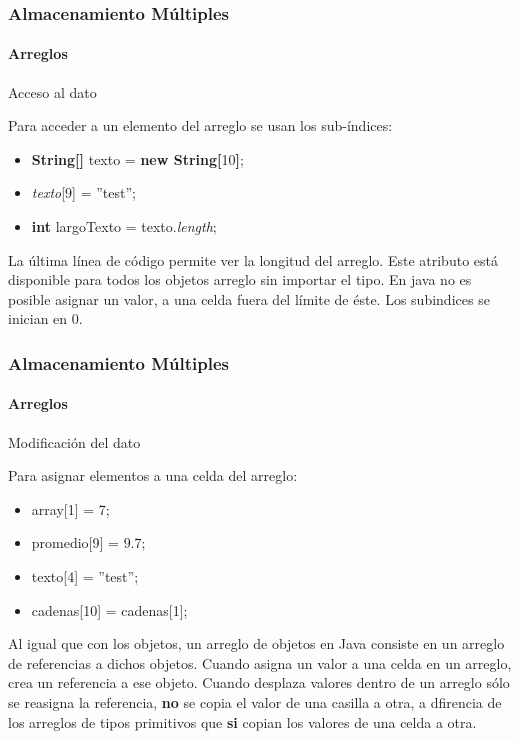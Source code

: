 \documentclass{beamer}
\begin{document}
        \begin{frame}
			\frametitle{Almacenamiento M\'ultiples}
			\framesubtitle{Arreglos}

			\begin{block}{Acceso al dato}
			    {\scriptsize
				    Para acceder a un elemento del arreglo se usan los sub-\'indices:
				    \begin{itemize}
                        \item[] \textbf{String[]} texto = \textbf{new String[}10\textbf{]};
                        \item[] \emph{texto}[9] = ''test'';
                        \item[] \textbf{int} largoTexto = texto.\emph{length};
                     \end{itemize}
			    }
			\end{block}
			\begin{block}{}
			    {\scriptsize
                     La \'ultima l\'inea de c\'odigo permite ver la longitud del arreglo. Este atributo est\'a disponible para todos los objetos arreglo sin importar el tipo. En java no es posible asignar un valor, a una celda fuera del l\'imite de \'este. Los subindices se inician en 0.
			    }
			\end{block}
		\end{frame}

        \begin{frame}
			\frametitle{Almacenamiento M\'ultiples}
			\framesubtitle{Arreglos}

			\begin{block}{Modificaci\'on del dato}
			    {\scriptsize
				    Para asignar elementos a una celda del arreglo:
				    \begin{itemize}
                        \item[] array[1] = 7;
                        \item[] promedio[9] = $9.7$;
                        \item[] texto[4] = ''test'';
                        \item[] cadenas[10] = cadenas[1];
                     \end{itemize}
			    }
			\end{block}
			\begin{block}{}
			    {\scriptsize
                     Al igual que con los objetos, un arreglo de objetos en Java consiste en un arreglo de referencias a dichos objetos. Cuando asigna un valor a una celda en un arreglo, crea un referencia a ese objeto. Cuando desplaza valores dentro de un arreglo s\'olo se reasigna la referencia, {\textbf{no}} se copia el valor de una casilla a otra, a dfirencia de los arreglos de tipos primitivos que {\textbf{si}} copian los valores de una celda a otra.
			    }
			\end{block}
		\end{frame}
\end{document}
